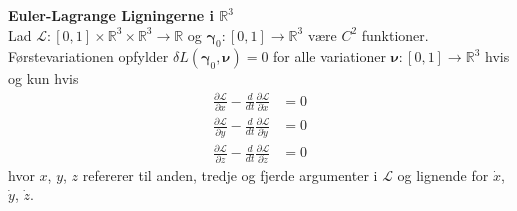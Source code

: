 \begin{thm} {\bf Euler-Lagrange Ligningerne i $\mathbb{R}^3$}\\
Lad $\mathcal{L} : [0,1] \times \mathbb{R}^3 \times \mathbb{R}^3 \to \mathbb{R}$ og ${\boldsymbol \gamma}_0 : [0,1] \to \mathbb{R}^3$ være $C^2$ funktioner. Førstevariationen opfylder $\delta L({\boldsymbol \gamma}_0, {\boldsymbol \nu}) = 0$ for alle variationer ${\boldsymbol \nu} :  [0,1] \to \mathbb{R}^3$ hvis og kun hvis
\begin{align}
\frac{\partial\mathcal{L}}{\partial x} -\frac{d}{dt}\frac{\partial\mathcal{L}}{\partial \dot{x}} &= 0 \\
\frac{\partial\mathcal{L}}{\partial y} -\frac{d}{dt} \frac{\partial\mathcal{L}}{\partial \dot{y}} &=0 \\
\frac{\partial\mathcal{L}}{\partial z} -\frac{d}{dt} \frac{\partial\mathcal{L}}{\partial \dot{z}} &=0
\end{align}
hvor $x$, $y$, $z$ refererer til anden, tredje og fjerde argumenter i $\mathcal{L}$ og lignende for $\dot{x}$, $\dot{y}$, $\dot{z}$.
\end{thm}

